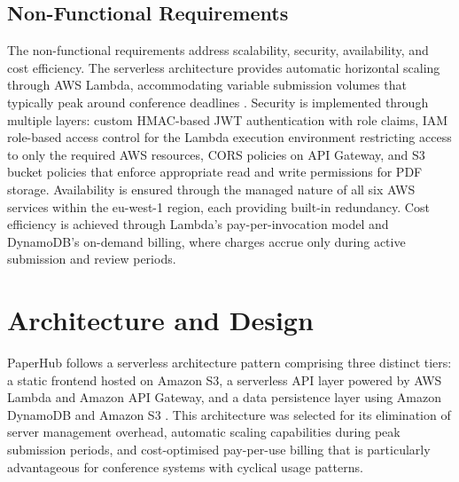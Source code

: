 \documentclass[conference]{IEEEtran}
\begin{document}
\subsection{Non-Functional Requirements}

The non-functional requirements address scalability, security, availability, and cost efficiency. The serverless architecture provides automatic horizontal scaling through AWS Lambda, accommodating variable submission volumes that typically peak around conference deadlines \cite{awslambda}. Security is implemented through multiple layers: custom HMAC-based JWT authentication with role claims, IAM role-based access control for the Lambda execution environment restricting access to only the required AWS resources, CORS policies on API Gateway, and S3 bucket policies that enforce appropriate read and write permissions for PDF storage. Availability is ensured through the managed nature of all six AWS services within the eu-west-1 region, each providing built-in redundancy. Cost efficiency is achieved through Lambda's pay-per-invocation model and DynamoDB's on-demand billing, where charges accrue only during active submission and review periods.

\section{Architecture and Design}

PaperHub follows a serverless architecture pattern comprising three distinct tiers: a static frontend hosted on Amazon S3, a serverless API layer powered by AWS Lambda and Amazon API Gateway, and a data persistence layer using Amazon DynamoDB and Amazon S3 \cite{cloudpatterns}. This architecture was selected for its elimination of server management overhead, automatic scaling capabilities during peak submission periods, and cost-optimised pay-per-use billing that is particularly advantageous for conference systems with cyclical usage patterns.
\end{document}
